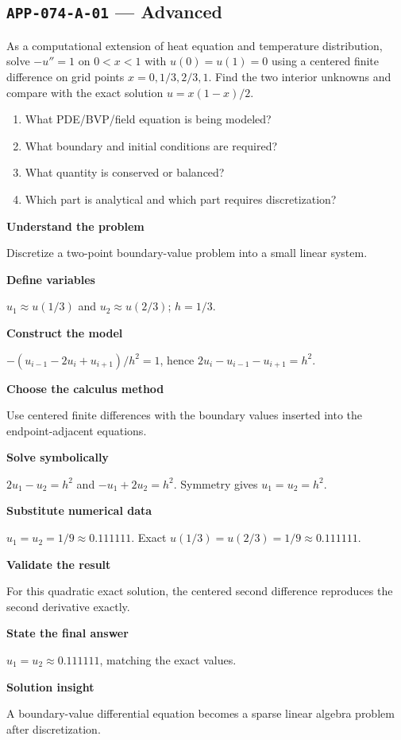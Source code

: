 \documentclass[11pt]{book}
\newcommand{\pid}[1]{\texttt{#1}}
\begin{document}
\subsection*{\pid{APP-074-A-01} — Advanced}
\begin{problembox}
As a computational extension of heat equation and temperature distribution, solve $-u''=1$ on $0<x<1$ with $u(0)=u(1)=0$ using a centered finite difference on grid points $x=0,1/3,2/3,1$. Find the two interior unknowns and compare with the exact solution $u=x(1-x)/2$.
\end{problembox}
\begin{promptbox}\begin{enumerate}
\item What PDE/BVP/field equation is being modeled?
\item What boundary and initial conditions are required?
\item What quantity is conserved or balanced?
\item Which part is analytical and which part requires discretization?
\end{enumerate}\end{promptbox}
\begin{solutionbox}
\textbf{Understand the problem}\par Discretize a two-point boundary-value problem into a small linear system.\par\medskip
\textbf{Define variables}\par $u_1\approx u(1/3)$ and $u_2\approx u(2/3)$; $h=1/3$.\par\medskip
\textbf{Construct the model}\par $-(u_{i-1}-2u_i+u_{i+1})/h^2=1$, hence $2u_i-u_{i-1}-u_{i+1}=h^2$.\par\medskip
\textbf{Choose the calculus method}\par Use centered finite differences with the boundary values inserted into the endpoint-adjacent equations.\par\medskip
\textbf{Solve symbolically}\par $2u_1-u_2=h^2$ and $-u_1+2u_2=h^2$. Symmetry gives $u_1=u_2=h^2$.\par\medskip
\textbf{Substitute numerical data}\par $u_1=u_2=1/9\approx 0.111111$. Exact $u(1/3)=u(2/3)=1/9\approx 0.111111$.\par\medskip
\textbf{Validate the result}\par For this quadratic exact solution, the centered second difference reproduces the second derivative exactly.\par\medskip
\textbf{State the final answer}\par $u_1=u_2\approx 0.111111$, matching the exact values.\par\medskip
\textbf{Solution insight}\par A boundary-value differential equation becomes a sparse linear algebra problem after discretization.\par\medskip
\end{solutionbox}
\end{document}

